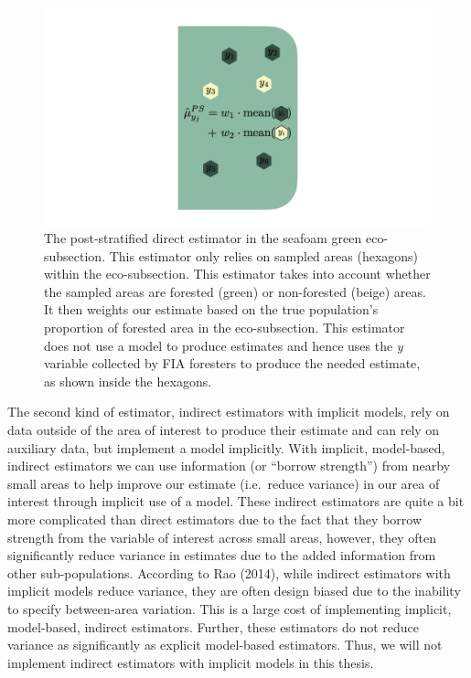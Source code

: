 \documentclass[12pt,twoside]{reedthesis}
\begin{document}
\begin{figure}

{\centering \includegraphics[width=1\linewidth]{figure/ps-diagram} 

}

\caption[The post-stratified direct estimator]{The post-stratified direct estimator in the seafoam green eco-subsection. This estimator only relies on sampled areas (hexagons) within the eco-subsection. This estimator takes into account whether the sampled areas are forested (green) or non-forested (beige) areas. It then weights our estimate based on the true population's proportion of forested area in the eco-subsection. This estimator does not use a model to produce estimates and hence uses the \textit{y} variable collected by FIA foresters to produce the needed estimate, as shown inside the hexagons.}\label{fig:ps-diagram}
\end{figure}
The second kind of estimator, indirect estimators with implicit models, rely on data outside of the area of interest to produce their estimate and can rely on auxiliary data, but implement a model implicitly. With implicit, model-based, indirect estimators we can use information (or ``borrow strength'') from nearby small areas to help improve our estimate (i.e.~reduce variance) in our area of interest through implicit use of a model. These indirect estimators are quite a bit more complicated than direct estimators due to the fact that they borrow strength from the variable of interest across small areas, however, they often significantly reduce variance in estimates due to the added information from other sub-populations. According to Rao (2014), while indirect estimators with implicit models reduce variance, they are often design biased due to the inability to specify between-area variation. This is a large cost of implementing implicit, model-based, indirect estimators. Further, these estimators do not reduce variance as significantly as explicit model-based estimators. Thus, we will not implement indirect estimators with implicit models in this thesis.
\end{document}
